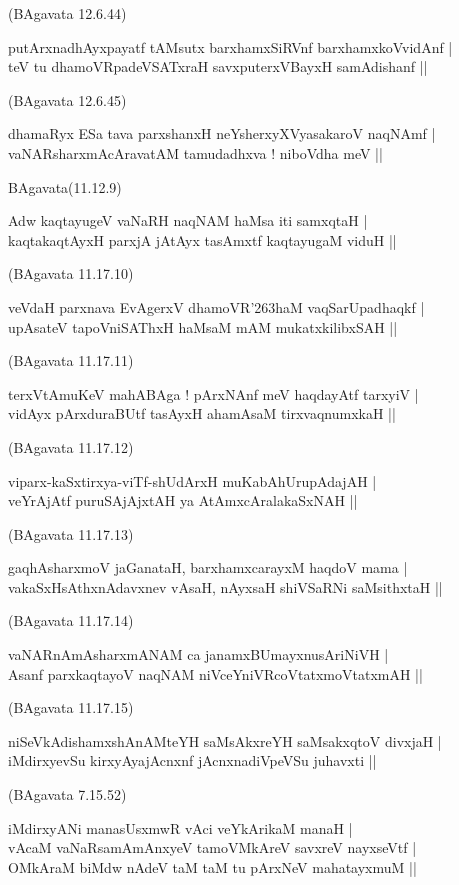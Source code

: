 \begin{itemize}
{\hfill{(BAgavata 12.6.44)}
\item[11.] putArxnadhAyxpayatf tAMsutx barxhamxSiRVnf barxhamxkoVvidAnf |\\
teV tu dhamoVRpadeVSATxraH savxputerxVBayxH samAdishanf ||

\hfill{(BAgavata 12.6.45)}
\item[12.] dhamaRyx ESa tava parxshanxH neYsherxyXVyasakaroV naqNAmf |\\\label{145}
vaNARsharxmAcAravatAM tamudadhxva ! niboVdha meV ||

\hfill{BAgavata(11.12.9)}
\item[13.] Adw kaqtayugeV vaNaRH naqNAM haMsa iti samxqtaH |\\
kaqtakaqtAyxH parxjA jAtAyx tasAmxtf kaqtayugaM viduH ||

\hfill{(BAgavata 11.17.10)}
\item[14.] veVdaH parxnava EvAgerxV dhamoVR\char'263haM vaqSarUpadhaqkf |\\
upAsateV tapoVniSAThxH haMsaM mAM mukatxkilibxSAH ||

\hfill{(BAgavata 11.17.11)}
\item[15.] terxVtAmuKeV mahABAga ! pArxNAnf meV haqdayAtf tarxyiV |\\
vidAyx pArxduraBUtf tasAyxH ahamAsaM tirxvaqnumxkaH ||

\hfill{(BAgavata 11.17.12)}
\item[16.] viparx-kaSxtirxya-viTf-shUdArxH muKabAhUrupAdajAH |\\
veYrAjAtf puruSAjAjxtAH ya AtAmxcAralakaSxNAH ||

\hfill{(BAgavata 11.17.13)}
\item[17.] gaqhAsharxmoV jaGanataH, barxhamxcarayxM haqdoV mama |\\
vakaSxHsAthxnAdavxnev vAsaH, nAyxsaH shiVSaRNi saMsithxtaH ||

\hfill{(BAgavata 11.17.14)}
\item[18.] vaNARnAmAsharxmANAM ca janamxBUmayxnusAriNiVH |\\
Asanf parxkaqtayoV naqNAM niVceYniVRcoVtatxmoVtatxmAH ||

\hfill{(BAgavata 11.17.15)}
\item[19.] niSeVkAdishamxshAnAMteYH saMsAkxreYH saMsakxqtoV divxjaH |\\
iMdirxyevSu kirxyAyajAcnxnf jAcnxnadiVpeVSu juhavxti ||\label{146}

\hfill{(BAgavata 7.15.52)}}

{\bf
\item[20.] iMdirxyANi manasUsxmwR vAci veYkArikaM manaH |\\
vAcaM vaNaRsamAmAnxyeV tamoVMkAreV savxreV nayxseVtf |\\
OMkAraM biMdw nAdeV taM taM tu pArxNeV mahatayxmuM ||

}
\end{itemize}
